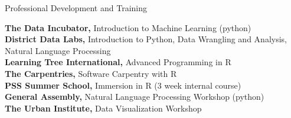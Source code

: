 \documentclass{resume} %
\begin{document}
\begin{rSection}{Professional Development and Training}

{\bf The Data Incubator, }{Introduction to Machine Learning (python)}\\
{\bf District Data Labs, } {Introduction to Python, Data Wrangling and Analysis, Natural Language Processing}\\
{\bf Learning Tree International, }{Advanced Programming in R}\\
{\bf The Carpentries, }{Software Carpentry with R}\\
{\bf PSS Summer School, }{Immersion in R (3 week internal course)}\\
{\bf General Assembly, }{Natural Language Processing Workshop (python)}\\
{\bf The Urban Institute, }{Data Visualization Workshop}


\end{rSection}
\end{document}
